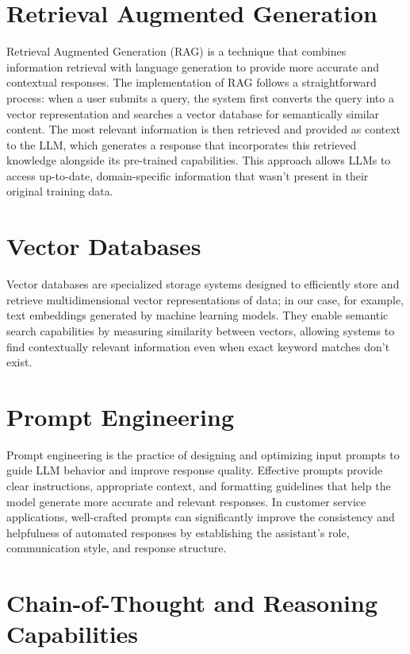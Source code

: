 \section{Retrieval Augmented Generation}
\label{sec:rag}

Retrieval Augmented Generation (RAG) is a technique that combines information retrieval with language generation to provide more accurate and contextual responses.
The implementation of RAG follows a straightforward process: when a user submits a query, the system first converts the query into a vector representation and searches a vector database for semantically similar content.
The most relevant information is then retrieved and provided as context to the LLM, which generates a response that incorporates this retrieved knowledge alongside its pre-trained capabilities.
This approach allows LLMs to access up-to-date, domain-specific information that wasn't present in their original training data.

\section{Vector Databases}
\label{sec:vecdb}

Vector databases are specialized storage systems designed to efficiently store and retrieve multidimensional vector representations of data; in our case, for example, text embeddings generated by machine learning models.
They enable semantic search capabilities by measuring similarity between vectors, allowing systems to find contextually relevant information even when exact keyword matches don't exist.

\section{Prompt Engineering}
\label{sec:prompt-engineering}

Prompt engineering is the practice of designing and optimizing input prompts to guide LLM behavior and improve response quality.
Effective prompts provide clear instructions, appropriate context, and formatting guidelines that help the model generate more accurate and relevant responses.
In customer service applications, well-crafted prompts can significantly improve the consistency and helpfulness of automated responses by establishing the assistant's role, communication style, and response structure.

\section{Chain-of-Thought and Reasoning Capabilities}
\label{sec:thinking}

